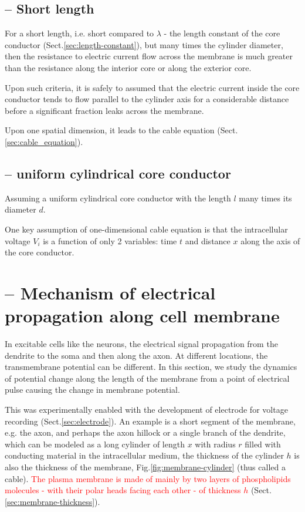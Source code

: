 \subsection{-- Short length}
\label{sec:short-length}

For a short length, i.e. short compared to $\lambda$ - the length constant of
the core conductor (Sect.\ref{sec:length-constant}), but many times the cylinder
diameter, then the resistance to electric current flow across the membrane is
much greater than the resistance along the interior core or along the exterior
core.

Upon such criteria, it is safely to assumed that the electric current inside the
core conductor tends to flow parallel to the cylinder axis for a considerable
distance before a significant fraction leaks across the membrane.

Upon one spatial dimension, it leads to the cable equation
(Sect.\ref{sec:cable_equation}).

\subsection{-- uniform cylindrical core conductor}

Assuming a uniform cylindrical core conductor with the length $l$ many times its
diameter $d$.


One key assumption of one-dimensional cable equation is that the intracellular
voltage $V_i$ is a function of only 2 variables: time $t$ and distance $x$ along
the axis of the core conductor.

\section{-- Mechanism of electrical propagation along cell membrane}
\label{sec:electrical-propagation}

In excitable cells like the neurons, the electrical signal propagation from the
dendrite to the soma and then along the axon.
At different locations, the transmembrane potential can be different.
In this section, we study the dynamics of potential change along the length of
the membrane from a point of electrical pulse causing the change in membrane
potential.

This was experimentally enabled with the development of electrode for voltage
recording (Sect.\ref{sec:electrode}). An example is a short segment of the
membrane, e.g. the axon, and perhaps the axon hillock or a single branch of the
dendrite, which can be modeled as a long cylinder of length $x$ with radius $r$
filled with conducting material in the intracellular medium, the thickness of
the cylinder $h$ is also the thickness of the membrane,
Fig.\ref{fig:membrane-cylinder} (thus called a cable).
\textcolor{red}{The plasma membrane is made of mainly by two layers of
phospholipids molecules - with their  polar heads facing each other - of
thickness $h$} (Sect.\ref{sec:membrane-thickness}).

